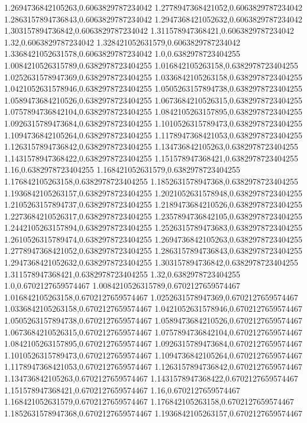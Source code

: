 1.2694736842105263,0.6063829787234042
1.2778947368421052,0.6063829787234042
1.2863157894736843,0.6063829787234042
1.2947368421052632,0.6063829787234042
1.303157894736842,0.6063829787234042
1.311578947368421,0.6063829787234042
1.32,0.6063829787234042
1.328421052631579,0.6063829787234042
1.3368421052631578,0.6063829787234042
1.0,0.6382978723404255
1.0084210526315789,0.6382978723404255
1.016842105263158,0.6382978723404255
1.0252631578947369,0.6382978723404255
1.0336842105263158,0.6382978723404255
1.0421052631578946,0.6382978723404255
1.0505263157894738,0.6382978723404255
1.0589473684210526,0.6382978723404255
1.0673684210526315,0.6382978723404255
1.0757894736842104,0.6382978723404255
1.0842105263157895,0.6382978723404255
1.0926315789473684,0.6382978723404255
1.1010526315789473,0.6382978723404255
1.1094736842105264,0.6382978723404255
1.1178947368421053,0.6382978723404255
1.1263157894736842,0.6382978723404255
1.134736842105263,0.6382978723404255
1.1431578947368422,0.6382978723404255
1.151578947368421,0.6382978723404255
1.16,0.6382978723404255
1.168421052631579,0.6382978723404255
1.176842105263158,0.6382978723404255
1.1852631578947368,0.6382978723404255
1.1936842105263157,0.6382978723404255
1.2021052631578948,0.6382978723404255
1.2105263157894737,0.6382978723404255
1.2189473684210526,0.6382978723404255
1.2273684210526317,0.6382978723404255
1.2357894736842105,0.6382978723404255
1.2442105263157894,0.6382978723404255
1.2526315789473683,0.6382978723404255
1.2610526315789474,0.6382978723404255
1.2694736842105263,0.6382978723404255
1.2778947368421052,0.6382978723404255
1.2863157894736843,0.6382978723404255
1.2947368421052632,0.6382978723404255
1.303157894736842,0.6382978723404255
1.311578947368421,0.6382978723404255
1.32,0.6382978723404255
1.0,0.6702127659574467
1.0084210526315789,0.6702127659574467
1.016842105263158,0.6702127659574467
1.0252631578947369,0.6702127659574467
1.0336842105263158,0.6702127659574467
1.0421052631578946,0.6702127659574467
1.0505263157894738,0.6702127659574467
1.0589473684210526,0.6702127659574467
1.0673684210526315,0.6702127659574467
1.0757894736842104,0.6702127659574467
1.0842105263157895,0.6702127659574467
1.0926315789473684,0.6702127659574467
1.1010526315789473,0.6702127659574467
1.1094736842105264,0.6702127659574467
1.1178947368421053,0.6702127659574467
1.1263157894736842,0.6702127659574467
1.134736842105263,0.6702127659574467
1.1431578947368422,0.6702127659574467
1.151578947368421,0.6702127659574467
1.16,0.6702127659574467
1.168421052631579,0.6702127659574467
1.176842105263158,0.6702127659574467
1.1852631578947368,0.6702127659574467
1.1936842105263157,0.6702127659574467
